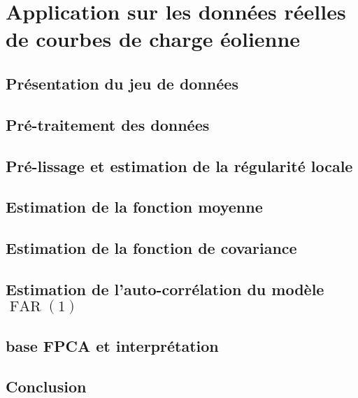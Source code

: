 \chapter{
  Application sur les données réelles de courbes de charge éolienne
 }
\minitoc%

\section{Présentation du jeu de données}

\section{Pré-traitement des données}

\section{Pré-lissage et estimation de la régularité locale}

\section{Estimation de la fonction moyenne}

\section{Estimation de la fonction de covariance}

\section{Estimation de l'auto-corrélation du modèle $\operatorname{FAR}(1)$}

\section{base FPCA et interprétation}

\section{Conclusion}